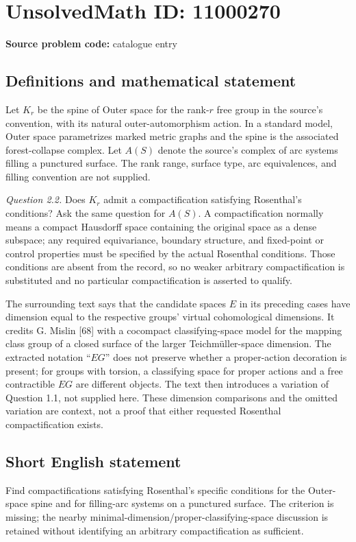 \documentclass[11pt]{article}
\begin{document}
\section*{UnsolvedMath ID: 11000270}
\textbf{Source problem code:} catalogue entry
\subsection{Definitions and mathematical statement}
Let \(K_r\) be the spine of Outer space for the rank-\(r\) free group in the source's convention, with its natural outer-automorphism action. In a standard model, Outer space parametrizes marked metric graphs and the spine is the associated forest-collapse complex. Let \(A(S)\) denote the source's complex of arc systems filling a punctured surface. The rank range, surface type, arc equivalences, and filling convention are not supplied.

\emph{Question 2.2.} Does \(K_r\) admit a compactification satisfying Rosenthal's conditions? Ask the same question for \(A(S)\). A compactification normally means a compact Hausdorff space containing the original space as a dense subspace; any required equivariance, boundary structure, and fixed-point or control properties must be specified by the actual Rosenthal conditions. Those conditions are absent from the record, so no weaker arbitrary compactification is substituted and no particular compactification is asserted to qualify.

The surrounding text says that the candidate spaces \(E\) in its preceding cases have dimension equal to the respective groups' virtual cohomological dimensions. It credits G. Mislin [68] with a cocompact classifying-space model for the mapping class group of a closed surface of the larger Teichm\"uller-space dimension. The extracted notation ``\(EG\)'' does not preserve whether a proper-action decoration is present; for groups with torsion, a classifying space for proper actions and a free contractible \(EG\) are different objects. The text then introduces a variation of Question 1.1, not supplied here. These dimension comparisons and the omitted variation are context, not a proof that either requested Rosenthal compactification exists.
\subsection{Short English statement}
Find compactifications satisfying Rosenthal's specific conditions for the Outer-space spine and for filling-arc systems on a punctured surface. The criterion is missing; the nearby minimal-dimension/proper-classifying-space discussion is retained without identifying an arbitrary compactification as sufficient.
\end{document}

